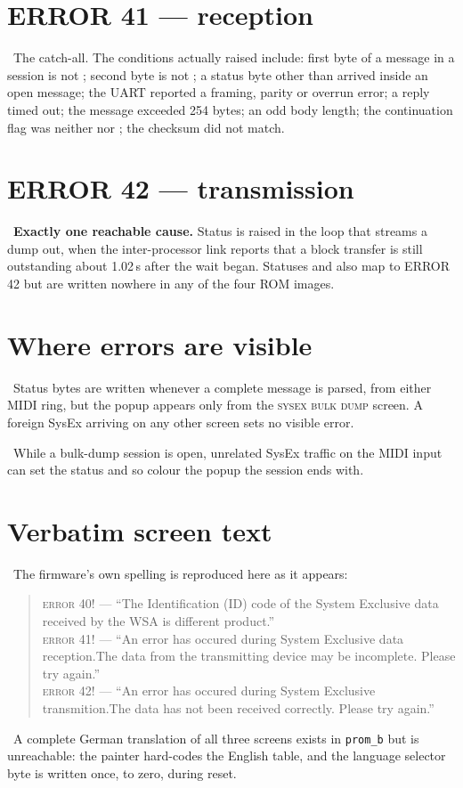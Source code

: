 \section{ERROR 41 --- reception}
\estab\ The catch-all. The conditions actually raised include: first byte of a message in
a session is not ; second byte is not ; a status byte other than
 arrived inside an open message; the UART reported a framing, parity or
overrun error; a reply timed out; the message exceeded 254 bytes; an odd body length; the
continuation flag was neither  nor ; the checksum did not match.

\section{ERROR 42 --- transmission}
\estab\ \textbf{Exactly one reachable cause.} Status  is raised in the loop
that streams a dump out, when the inter-processor link reports that a block transfer is
still outstanding about 1.02\,s after the wait began. Statuses  and
 also map to ERROR 42 but are written nowhere in any of the four ROM images.

\section{Where errors are visible}
\estab\ Status bytes are written whenever a complete message is parsed, from either MIDI
ring, but the popup appears only from the \textsc{sysex bulk dump} screen. A foreign SysEx
arriving on any other screen sets no visible error.

\estab\ While a bulk-dump session is open, unrelated SysEx traffic on the MIDI input can
set the status and so colour the popup the session ends with.

\section{Verbatim screen text}
\estab\ The firmware's own spelling is reproduced here as it appears:

\begin{quote}\small
\textsc{error 40!} --- ``The Identification (ID) code of the System Exclusive data received
by the WSA is different product.''\\[2pt]
\textsc{error 41!} --- ``An error has occured during System Exclusive data reception.The
data from the transmitting device may be incomplete. Please try again.''\\[2pt]
\textsc{error 42!} --- ``An error has occured during System Exclusive transmition.The data
has not been received correctly. Please try again.''
\end{quote}

\estab\ A complete German translation of all three screens exists in \texttt{prom\_b} but
is unreachable: the painter hard-codes the English table, and the language selector byte is
written once, to zero, during reset.
